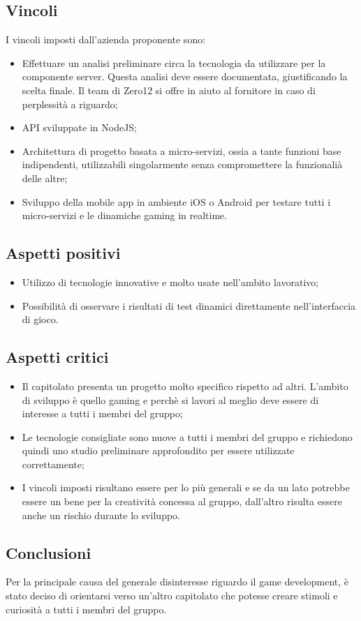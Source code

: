 \subsection{Vincoli}
I vincoli imposti dall'azienda proponente sono:
\begin{itemize}
\item Effettuare un analisi preliminare circa la tecnologia da utilizzare per la componente server. Questa analisi deve essere documentata, giustificando la scelta finale. Il team di Zero12 si offre in aiuto al fornitore in caso di perplessità a riguardo;
\item API sviluppate in NodeJS;
\item Architettura di progetto basata a micro-servizi, ossia a tante funzioni base indipendenti, utilizzabili singolarmente senza compromettere la funzionalià delle altre;
\item Sviluppo della mobile app in ambiente iOS o Android per testare tutti i micro-servizi e le dinamiche gaming in realtime. 
\end{itemize}

\subsection{Aspetti positivi}
\begin{itemize}
\item Utilizzo di tecnologie innovative e molto usate nell'ambito lavorativo;
\item Possibilità di osservare i risultati di test dinamici direttamente nell'interfaccia di gioco.
\end{itemize}

\subsection{Aspetti critici}
\begin{itemize}
\item Il capitolato presenta un progetto molto specifico rispetto ad altri. L'ambito di sviluppo è quello gaming e perchè si lavori al meglio deve essere di interesse a tutti i membri del gruppo;
\item Le tecnologie consigliate sono nuove a tutti i membri del gruppo e richiedono quindi uno studio preliminare approfondito per essere utilizzate correttamente;
\item I vincoli imposti risultano essere per lo più generali e se da un lato potrebbe essere un bene per la creatività concessa al gruppo, dall'altro risulta essere anche un rischio durante lo sviluppo. 
\end{itemize}

\subsection{Conclusioni}
Per la principale causa del generale disinteresse riguardo il game development, è stato deciso di orientarsi verso un'altro capitolato che potesse creare stimoli e curiosità a tutti i membri del gruppo.
